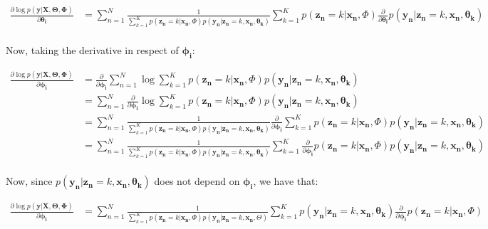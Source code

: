 \documentclass[12pt,a4paper,oneside]{paper}
\begin{document}
\begin{align*}
    \frac{\partial \log p(\bm{y} | \bm{X}, \bm{\Theta}, \bm{\Phi})}{\partial \bm{\theta_i}} &= \sum_{n=1}^{N} \frac{1}{\sum_{k=1}^{K} p(\bm{z_n} = k | \bm{x_n}, \Phi) p(\bm{y_n} | \bm{z_n} = k, \bm{x_n}, \bm{\theta_k})} \sum_{k=1}^{K} p(\bm{z_n} = k | \bm{x_n}, \Phi) \frac{\partial}{\partial \bm{\theta_i}} p(\bm{y_n} | \bm{z_n} = k, \bm{x_n}, \bm{\theta_k}) \\
\end{align*}

Now, taking the derivative in respect of $\bm{\phi_i}$:

\begin{align*}
    \frac{\partial \log p(\bm{y} | \bm{X}, \bm{\Theta}, \bm{\Phi})}{\partial \bm{\phi_i}} &= \frac{\partial}{\partial \bm{\phi_i}} \sum_{n=1}^{N} \log \sum_{k=1}^{K} p(\bm{z_n} = k | \bm{x_n}, \Phi) p(\bm{y_n} | \bm{z_n} = k, \bm{x_n}, \bm{\theta_k}) \\
    &= \sum_{n=1}^{N} \frac{\partial}{\partial \bm{\phi_i}} \log \sum_{k=1}^{K} p(\bm{z_n} = k | \bm{x_n}, \Phi) p(\bm{y_n} | \bm{z_n} = k, \bm{x_n}, \bm{\theta_k}) \\
    &= \sum_{n=1}^{N} \frac{1}{\sum_{k=1}^{K} p(\bm{z_n} = k | \bm{x_n}, \Phi) p(\bm{y_n} | \bm{z_n} = k, \bm{x_n}, \bm{\theta_k})} \frac{\partial}{\partial \bm{\phi_i}} \sum_{k=1}^{K} p(\bm{z_n} = k | \bm{x_n}, \Phi) p(\bm{y_n} | \bm{z_n} = k, \bm{x_n}, \bm{\theta_k}) \\
    &= \sum_{n=1}^{N} \frac{1}{\sum_{k=1}^{K} p(\bm{z_n} = k | \bm{x_n}, \Phi) p(\bm{y_n} | \bm{z_n} = k, \bm{x_n}, \bm{\theta_k})} \sum_{k=1}^{K} \frac{\partial}{\partial \bm{\phi_i}} p(\bm{z_n} = k | \bm{x_n}, \Phi) p(\bm{y_n} | \bm{z_n} = k, \bm{x_n}, \bm{\theta_k}) \\
\end{align*}

Now, since $p(\bm{y_n} | \bm{z_n} = k, \bm{x_n}, \bm{\theta_k})$ does not depend on $\bm{\phi_i}$, we have that:

\begin{align*}
    \frac{\partial \log p(\bm{y} | \bm{X}, \bm{\Theta}, \bm{\Phi})}{\partial \bm{\phi_i}} &= \sum_{n=1}^{N} \frac{1}{\sum_{k=1}^{K} p(\bm{z_n} = k | \bm{x_n}, \Phi) p(\bm{y_n} | \bm{z_n} = k, \bm{x_n}, \Theta)} \sum_{k=1}^{K} p(\bm{y_n} | \bm{z_n} = k, \bm{x_n}, \bm{\theta_k}) \frac{\partial}{\partial \bm{\phi_i}} p(\bm{z_n} = k | \bm{x_n}, \Phi) \\
\end{align*}
\end{document}

